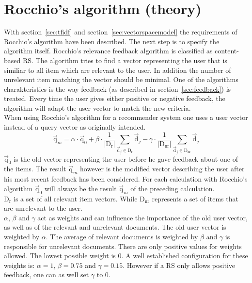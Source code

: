 
\section{Rocchio's algorithm (theory)}
\label{sec:rocchio}
\iffalse
Beschreibung des Rocchio algorithmus
\fi
With section~\ref{sec:tfidf} and section~\ref{sec:vectorspacemodel} the requirements of Rocchio's algorithm have been described.\citep[p.~178]{manning:2009}
The next step is to specify the algorithm itself.
Rocchio's relevance feedback algorithm is classified as content-based RS.\citep[p.~92]{lops:2011}
The algorithm tries to find a vector representing the user that is similiar to all item which are relevant to the user.
In addition the number of unrelevant item matching the vector should be minimal.\citep[p.~178-181]{manning:2009}
One of the algorithms charakteristics is the way feedback (as described in section~\ref{sec:feedback}) is treated.
Every time the user gives either positive or negative feedback, the algorithm will adapt the user vector to match the new criteria.\citep[p.~387-388]{pazzani:2007}
\\

When using Rocchio's algorithm for a recommender system one uses a user vector instead of a query vector as originally intended.
\begin{equation}
    \vec{\text{q}}_m =
        \alpha \cdot \vec{\text{q}}_0
        + \beta \cdot \frac{1}{|\text{D}_\text{r}|}\sum_{\vec{\text{d}}_j\in \text{D}_\text{r}} \vec{\text{d}}_j
        - \gamma \cdot \frac{1}{|\text{D}_\text{nr}|}\sum_{\vec{\text{d}}_j\in \text{D}_\text{nr}} \vec{\text{d}}_j
\end{equation}
$\vec{\text{q}}_0$ is the old vector representing the user before he gave feedback about one of the items.
The result $\vec{\text{q}}_m$ however is the modified vector describing the user after his most recent feedback has been considered.
For each calculation with Rocchio's algorithm $\vec{\text{q}}_0$ will always be the result $\vec{\text{q}}_m$ of the preceding calculation.\\
$\text{D}_\text{r}$ is a set of all relevant item vectors.
While $\text{D}_\text{nr}$ represents a set of items that are unrelevant to the user.\\
$\alpha$, $\beta$ and $\gamma$ act as weights and can influence the importance of the old user vector, as well as of  the relevant and unrelevant documents.
The old user vector is weighted by $\alpha$.
The average of relevant documents is weighted by $\beta$ and $\gamma$ is responsible for unrelevant documents.
There are only positive values for weights allowed.
The lowest possible weight is 0.
A well established configuration for these weights is: $\alpha = 1$, $\beta = 0.75$ and $\gamma = 0.15$.
However if a RS only allows positive feedback, one can as well set $\gamma$ to 0.
\citep[p.~178-183]{manning:2009}

